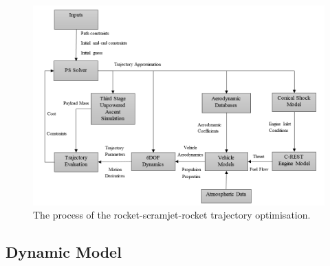 \begin{landscape}%
	\begin{figure}[ht]
		\centering
		\includegraphics[width=0.9\linewidth]{"figures/4_LODESTAR/Ascent Flowchart"}
		\caption{The process of the rocket-scramjet-rocket trajectory optimisation.}
		\label{fig:AscentFlowchart}
	\end{figure} 
\end{landscape}


\subsection{Dynamic Model}


